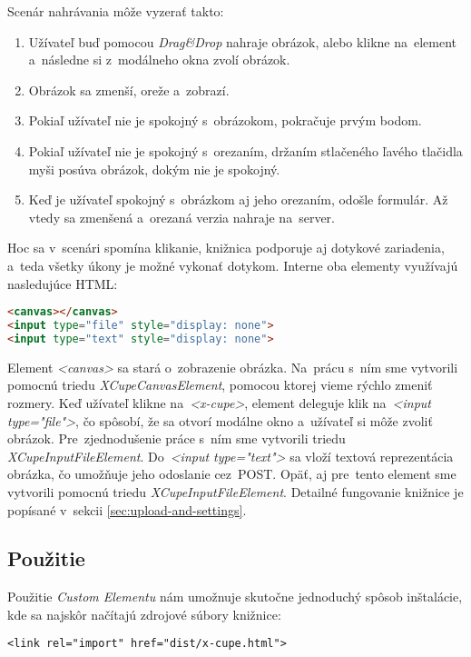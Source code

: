 Scenár nahrávania môže vyzerať takto:
\begin{enumerate}
	\item Užívateľ buď pomocou \emph{Drag\&Drop} nahraje obrázok, alebo klikne na~element a~následne si z~modálneho okna zvolí obrázok.
	\item Obrázok sa zmenší, oreže a~zobrazí.
	\item Pokiaľ užívateľ nie je spokojný s~obrázokom, pokračuje prvým bodom.
	\item Pokiaľ užívateľ nie je spokojný s~orezaním, držaním stlačeného ľavého tlačidla myši posúva obrázok, dokým nie je spokojný.
	\item Keď je užívateľ spokojný s~obrázkom aj jeho orezaním, odošle formulár. Až vtedy sa zmenšená a~orezaná verzia nahraje na~server.
\end{enumerate}

Hoc sa v~scenári spomína klikanie, knižnica podporuje aj dotykové zariadenia, a~teda všetky úkony je možné vykonať dotykom. Interne oba elementy využívajú nasledujúce HTML:

\begin{lstlisting}[language=HTML,caption=Interná štruktúra elementov \emph{<x-cupe>} a~\emph{<x-cupe-gallery>}.]
<canvas></canvas>
<input type="file" style="display: none">
<input type="text" style="display: none">
\end{lstlisting}


Element \emph{<canvas>} sa stará o~zobrazenie obrázka. Na~prácu s~ním sme vytvorili pomocnú triedu \emph{XCupeCanvasElement}, pomocou ktorej vieme rýchlo zmeniť rozmery. Keď užívateľ klikne na~\emph{<x-cupe>}, element deleguje klik na~\emph{<input type="file"\textgreater}, čo spôsobí, že sa otvorí modálne okno a~užívateľ si môže zvoliť obrázok. Pre~zjednodušenie práce s~ním sme vytvorili triedu \emph{XCupeInputFileElement}. Do~\emph{<input type="text"\textgreater} sa vloží textová reprezentácia obrázka, čo umožňuje jeho odoslanie cez~POST. Opäť, aj pre~tento element sme vytvorili pomocnú triedu \emph{XCupeInputFileElement}. Detailné fungovanie knižnice je popísané v~sekcii \ref{sec:upload-and-settings}.

\subsection{Použitie}

Použitie \emph{Custom Elementu} nám umožnuje skutočne jednoduchý spôsob inštalácie, kde sa najskôr načítajú zdrojové súbory knižnice:
\begin{lstlisting}
<link rel="import" href="dist/x-cupe.html">
\end{lstlisting}

